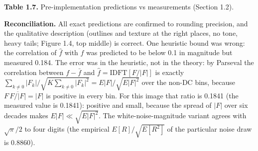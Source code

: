 \documentclass[10pt,a4paper]{article}
\begin{document}
\begin{table}[H]\centering\small{\small\textbf{Table 1.7.} Pre-implementation predictions vs measurements (Section 1.2).\par}\vskip 3pt
\end{table}
\textbf{Reconciliation.} All exact predictions are confirmed to rounding precision, and the qualitative description (outlines and texture at the right places, no tone, heavy tails; Figure 1.4, top middle) is correct. One heuristic bound was wrong: the correlation of $\hat f$ with $f$ was predicted to be below 0.1 in magnitude but measured 0.184. The error was in the heuristic, not in the theory: by Parseval the correlation between $f-\bar f$ and $\hat f=\mathrm{IDFT}[F/|F|]$ is exactly $\sum_{k\ne0}|F_k|/\sqrt{K\sum_{k\ne 0}|F_k|^2}=E|F|/\sqrt{E|F|^2}$ over the non-DC bins, because $F\,\overline{F/|F|}=|F|$ is positive in every bin. For this image that ratio is 0.1841 (the measured value is 0.1841): positive and small, because the spread of $|F|$ over six decades makes $E|F|\ll\sqrt{E|F|^2}$. The white-noise-magnitude variant agrees with $\sqrt\pi/2$ to four digits (the empirical $E[R]/\sqrt{E[R^2]}$ of the particular noise draw is 0.8860).
\end{document}
